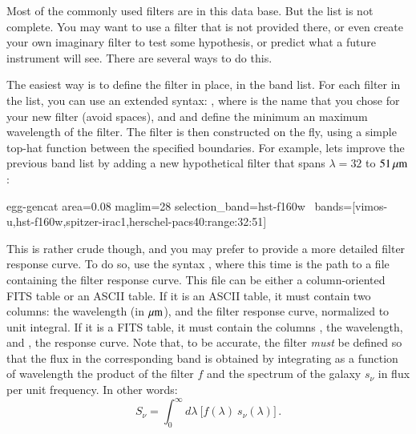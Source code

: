Most of the commonly used filters are in this data base. But the list is not complete. You may want to use a filter that is not provided there, or even create your own imaginary filter to test some hypothesis, or predict what a future instrument will see. There are several ways to do this.

The easiest way is to define the filter in place, in the band list. For each filter in the  list, you can use an extended syntax: , where  is the name that you chose for your new filter (avoid spaces), and \bashinline{[lmin]} and \bashinline{[lmax]} define the minimum an maximum wavelength of the filter. The filter is then constructed on the fly, using a simple top-hat function between the specified boundaries. For example, lets improve the previous band list by adding a new hypothetical filter  that spans $\lambda = 32$ to $51\,\mu{\rm m}$:
\begin{bashcode}
egg-gencat area=0.08 maglim=28 selection_band=hst-f160w \
    bands=[vimos-u,hst-f160w,spitzer-irac1,herschel-pacs40:range:32:51]
\end{bashcode}

This is rather crude though, and you may prefer to provide a more detailed filter response curve. To do so, use the syntax , where this time \bashinline{[path]} is the path to a file containing the filter response curve. This file can be either a column-oriented FITS table or an ASCII table. If it is an ASCII table, it must contain two columns: the wavelength (in $\mu{\rm m}$), and the filter response curve, normalized to unit integral. If it is a FITS table, it must contain the columns , the wavelength, and , the response curve. Note that, to be accurate, the filter \emph{must} be defined so that the flux in the corresponding band is obtained by integrating as a function of wavelength the product of the filter $f$ and the spectrum of the galaxy $s_\nu$ in flux per unit frequency. In other words:
\begin{equation}
    S_{\nu} = \int_0^{\infty} \!\!d\lambda\ \big[f(\lambda)\ s_\nu(\lambda)\big]\,. \nonumber
\end{equation}

